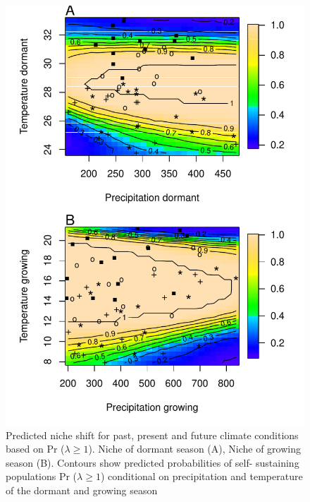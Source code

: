\documentclass[12pt]{article}
\begin{document}
\begin{figure}%
  \begin{center}
    \includegraphics[width=0.78\linewidth]{Figures/niche.pdf}
  \caption{Predicted niche shift for past, present and future climate conditions based on Pr ($\lambda \geq 1$). Niche of dormant season (A), Niche of growing season (B). Contours show predicted probabilities of self- sustaining populations Pr ($\lambda \geq 1$) conditional on precipitation and temperature of the dormant and growing season}
  \label{fig:geoproj}
  \end{center}
\end{figure}
\end{document}
